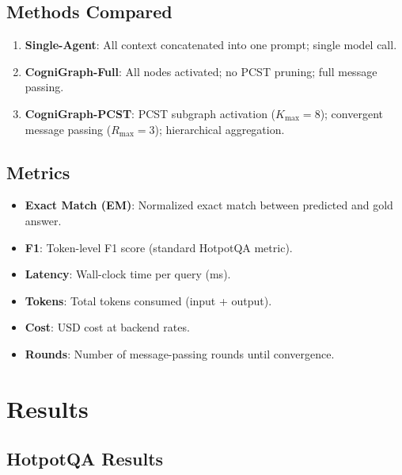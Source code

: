 \documentclass[a4paper,11pt]{article}
\theoremstyle{definition}
\begin{document}
\subsection{Methods Compared}

\begin{enumerate}
\item \textbf{Single-Agent}: All context concatenated into one prompt; single model call.
\item \textbf{CogniGraph-Full}: All nodes activated; no PCST pruning; full message passing.
\item \textbf{CogniGraph-PCST}: PCST subgraph activation ($K_{\max}=8$); convergent message passing ($R_{\max}=3$); hierarchical aggregation.
\end{enumerate}

\subsection{Metrics}

\begin{itemize}
\item \textbf{Exact Match (EM)}: Normalized exact match between predicted and gold answer.
\item \textbf{F1}: Token-level F1 score (standard HotpotQA metric).
\item \textbf{Latency}: Wall-clock time per query (ms).
\item \textbf{Tokens}: Total tokens consumed (input + output).
\item \textbf{Cost}: USD cost at backend rates.
\item \textbf{Rounds}: Number of message-passing rounds until convergence.
\end{itemize}

\section{Results}
\label{sec:results}

\subsection{HotpotQA Results}
\end{document}
